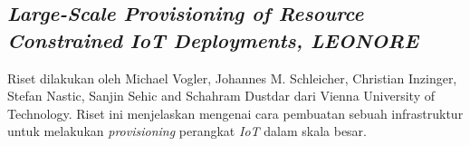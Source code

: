 \subsection{\textit{Large-Scale Provisioning of
    Resource Constrained
    IoT Deployments, LEONORE}}
Riset dilakukan oleh Michael Vogler, Johannes M. Schleicher, Christian Inzinger, Stefan Nastic, Sanjin Sehic and Schahram Dustdar dari Vienna University of Technology. Riset ini menjelaskan mengenai cara pembuatan sebuah infrastruktur untuk melakukan \textit{provisioning} perangkat \textit{IoT} dalam skala besar.